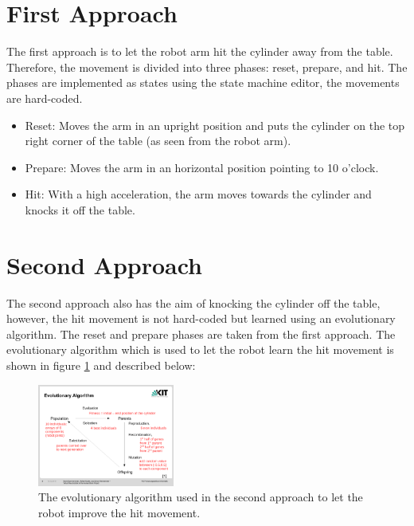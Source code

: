\documentclass[10pt,twocolumn,letterpaper]{article}
\begin{document}
\section{First Approach} \label{sec:firstApproach}

The first approach is to let the robot arm hit the cylinder away from the table. Therefore, the movement is divided into three phases: reset, prepare, and hit. The phases are implemented as states using the state machine editor, the movements are hard-coded.

\begin{itemize}
\item Reset: Moves the arm in an upright position and puts the cylinder on the top right corner of the table (as seen from the robot arm).
\item Prepare: Moves the arm in an horizontal position pointing to 10 o'clock.
\item Hit: With a high acceleration, the arm moves towards the cylinder and knocks it off the table.
\end{itemize}

\section{Second Approach} \label{sec:secondApproach}

The second approach also has the aim of knocking the cylinder off the table, however, the hit movement is not hard-coded but learned using an evolutionary algorithm. The reset and prepare phases are taken from the first approach.
The evolutionary algorithm which is used to let the robot learn the hit movement is shown in figure \ref{fig:EA_2} and described below:

\begin{figure}
	\begin{center}
		\includegraphics[trim = 1cm 2.3cm 1cm 4cm, clip, width=0.4\textwidth]{Presentation1-seiten-5}
	\end{center}
	\caption{The evolutionary algorithm used in the second approach to let the robot improve the hit movement.}
	\label{fig:EA_2}
\end{figure}
\end{document}
